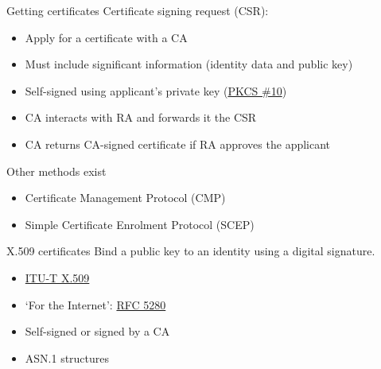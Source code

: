 \begin{frame}{Getting certificates}
  \pause
  Certificate signing request (CSR):
  \begin{itemize}[<+(1)->]
    \item Apply for a certificate with a CA
    \item Must include significant information (identity data and public key)
    \item Self-signed using applicant's private key (\href{https://datatracker.ietf.org/doc/html/rfc2986}{PKCS \#10})
    \item CA interacts with RA and forwards it the CSR
    \item CA returns CA-signed certificate if RA approves the applicant
  \end{itemize}

  \vspace*{1em}

  \pause
  Other methods exist
  \begin{itemize}[<+(1)->]
    \item Certificate Management Protocol (CMP)
    \item Simple Certificate Enrolment Protocol (SCEP)
  \end{itemize}
\end{frame}

\begin{frame}{X.509 certificates}
  \pause
  Bind a public key to an identity using a digital signature.
  \begin{itemize}[<+(1)->]
    \item \href{https://www.itu.int/rec/T-REC-X.509}{ITU-T X.509}
    \item `For the Internet': \href{https://datatracker.ietf.org/doc/html/rfc5280}{RFC 5280}
    \item Self-signed or signed by a CA
    \item ASN.1 structures
  \end{itemize}
\end{frame}

